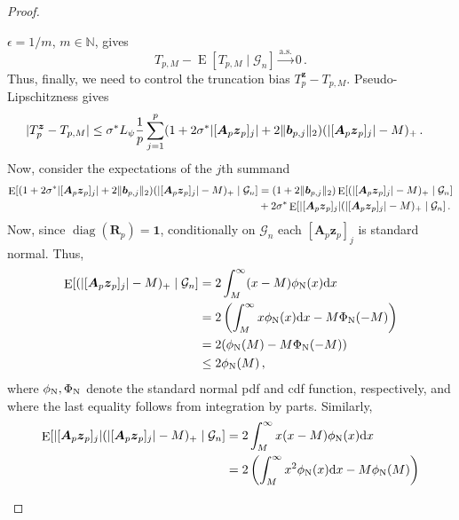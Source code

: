 \documentclass{article}
\makeatletter
\DeclareMathOperator{\expect}{E}
\DeclareMathOperator{\diag}{diag}
\theoremstyle{definition}
\newcommand{\vnorm}[1]{%
	\ensuremath{%
		\if@display
		\left\| #1 \right\|
		\else
		\| #1 \|
		\fi
	}%
}
\newcommand{\abs}[1]{%
	\ensuremath{%
		\if@display
		\left| #1 \right|
		\else
		\lvert #1 \rvert
		\fi
	}%
}
\newcommand*{\bb}{\boldsymbol}
\makeatother
\begin{document}
\begin{bibunit}
\begin{proof}
\begin{enumerate}[label=(\roman{*})]
$\epsilon=1/m$, $m\in\mathbb N$, gives
$$
    T_{p,M}
    -
    \expect[T_{p,M}\mid\mathcal G_n]
    \overset{\mathrm{a.s.}}{\longrightarrow}
    0\,.
$$
Thus, finally, we need to control the truncation bias 
$
     T_p^{\bb z} - T_{p,M}  
$. Pseudo-Lipschitzness gives
\begin{equation}
    \begin{aligned}
        \label{eq:T_p-bound} 
         \abs{T_p^{\bb z}-T_{p,M}} &\leq \sigma^* L_\psi \frac1p \sum_{j=1}^{p} (1 + 2 \sigma^* \abs{[\bb A_p\bb z_p]_j} + 2\vnorm{\bb b_{p,j}}_2) (\abs{[\bb A_p \bb z_p]_j} - M)_+ \,. 
    \end{aligned}
\end{equation}
Now, consider the expectations of the $j$th summand 
$$
    \begin{aligned}
        \expect[(1 + 2 \sigma^* \abs{[\bb A_p\bb z_p]_j} + 2\vnorm{\bb b_{p,j}}_2) (\abs{[\bb A_p \bb z_p]_j} - M)_+ \mid \mathcal G_n] &= (1 + 2 \vnorm{\bb b_{p,j}}_2) \expect[(\abs{[\bb A_p \bb z_p]_j} - M)_+ \mid \mathcal G_n]  \\ 
        &+ 2 \sigma^* \expect[ \abs{[\bb A_p \bb z_p]_j} (\abs{[\bb A_p \bb z_p]_j} - M)_+\mid \mathcal G_n] \,.
    \end{aligned}
$$
Now, since $\diag(\bb R_p)=\bb1$, conditionally on $\mathcal G_n$ each
$[\bb A_p \bb z_p]_j$ is standard normal. Thus,  
\begin{equation}
    \label{eq:first-exp} 
        \begin{aligned}
        \expect[(\abs{[\bb A_p \bb z_p]_j} - M)_+ \mid \mathcal G_n] &= 2 \int_{M}^\infty (x - M) \phi_{\rm N}(x) \mathrm{d}x \\ 
        &= 2 \left(\int_M^\infty x \phi_{\rm N}(x) \mathrm{d}x - M \Phi_{\rm N}(-M) \right) \\ 
        &= 2 (\phi_{\rm N}(M) - M \Phi_{\rm N}(-M)) \\  
        &\leq 2 \phi_{\rm N}(M) \,, 
    \end{aligned}
\end{equation}
where $\phi_{\rm N}, \Phi_{\rm N}$ denote the standard normal pdf and cdf function, respectively, and where the last equality follows from integration by parts. 
Similarly, 
\begin{equation}
    \begin{aligned}
        \expect[ \abs{[\bb A_p \bb z_p]_j} (\abs{[\bb A_p \bb z_p]_j} - M)_+\mid \mathcal G_n] &= 2 \int_{M}^\infty x (x - M) \phi_{\rm N}(x) \mathrm{d}x \\ 
        &= 2 \left(\int_M^\infty x^2 \phi_{\rm N}(x) \mathrm{d}x - M \phi_{\rm N}(M)  \right) \\ 

\end{aligned}
\end{equation}
\end{enumerate}
\end{proof}
\end{bibunit}
\end{document}
